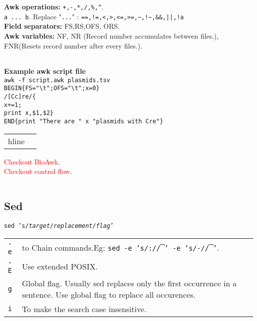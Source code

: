 \textbf{Awk operations:} \texttt{+,-,*,/,\%,\^{}}. \\
\texttt{a ... b}. Replace "\texttt{...}" : \texttt{==,!=,<,>,<=,>=,\~{},!\~{},\&\&,||,!a}\\
\textbf{Field separators:} FS,RS,OFS, ORS.\\
\textbf{Awk variables:} NF, NR (Record number accumulates between files.), FNR(Resets record number after every files.).\\

\begin{tabularx}{\linewidth}{lX}
    \hline
\end{tabularx}

\textbf{Example awk script file}\\
\texttt{awk -f script.awk plasmids.tsv}\\
\texttt{BEGIN\{FS="\textbackslash t";OFS="\textbackslash t";x=0\}}\\
\texttt{/[Cc]re/\{}\\
\texttt{x+=1;}\\
\texttt{print x,\$1,\$2\}}\\
\texttt{END\{print "There are " x "plasmids with Cre"\}}

\begin{tabularx}{\linewidth}{lX}
    hline
\end{tabularx}

\textcolor{red}{Checkout BioAwk}.\\
\textcolor{red}{Checkout control flow}.\\
\begin{tabularx}{\linewidth}{lX}
\hline
\end{tabularx}

\subsection{Sed}

\texttt{sed 's/\textit{target}/\textit{replacement}/\textit{flag}'}

\begin{tabularx}{\linewidth}{lX}
    \texttt{-e} & to Chain commands.Eg: \texttt{sed -e 's/:/\t/' -e 's/-/\t/'}.\\
    \texttt{-E} & Use extended POSIX.\\
    \texttt{g} & Global flag. Usually sed replaces only the first occurrence  in a sentence. Use global flag to replace all occurences.\\
    \texttt{i} & To make the search case insensitive.\\
\end{tabularx}

